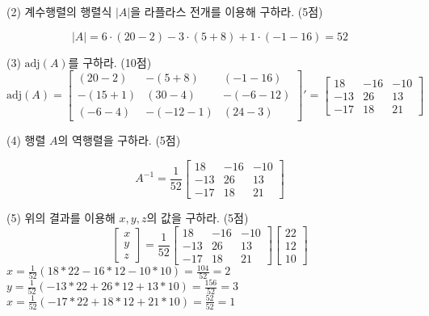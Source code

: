 \documentclass[aspectratio=169]{beamer}
\begin{document}
\begin{frame}
  (2) 계수행렬의 행렬식 \( |A| \)을 라플라스 전개를 이용해 구하라. (5점)

  \[
  |A| = 6 \cdot (20-2) - 3 \cdot (5+8) +1 \cdot (-1-16) = 52
  \]

  (3) \( \text{adj}(A) \)를 구하라. (10점)
  \[
    \text{adj}(A) = 
    \begin{bmatrix}
      (20-2) & -(5+8) & (-1-16) \\
      -(15+1) & (30-4) & -(-6-12) \\
      (-6-4) & -(-12-1) & (24 - 3)
    \end{bmatrix}'
    =\begin{bmatrix}
      18 & -16 & -10 \\
      -13 & 26 & 13 \\
      -17 & 18 & 21
    \end{bmatrix}
  \]


\end{frame}



\begin{frame}
  (4) 행렬 \( A \)의 역행렬을 구하라. (5점)

  \[
    A^{-1} = 
    \frac{1}{52}
    \begin{bmatrix}
      18 & -16 & -10 \\
      -13 & 26 & 13 \\
      -17 & 18 & 21
    \end{bmatrix}
  \]
  
  (5) 위의 결과를 이용해 \( x, y, z \)의 값을 구하라. (5점)  
  \[
    \begin{bmatrix}
      x \\
      y \\
      z 
    \end{bmatrix}
     = 
    \frac{1}{52}
    \begin{bmatrix}
      18 & -16 & -10 \\
      -13 & 26 & 13 \\
      -17 & 18 & 21
    \end{bmatrix}
    \begin{bmatrix}
      22 \\
      12 \\
      10 
    \end{bmatrix}
  \]
  $x = \frac{1}{52}(18*22 - 16*12 - 10*10) = \frac{104}{52} = 2$
  $y = \frac{1}{52}(-13*22 + 26*12 + 13*10) = \frac{156}{52} = 3$
  $x = \frac{1}{52}(-17*22 + 18*12 + 21*10) = \frac{52}{52} = 1$
\end{frame}
\end{document}
